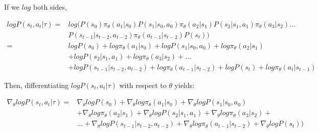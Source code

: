 \documentclass[letterpaper,11pt]{article}
\begin{document}
\vspace{0.2cm}
\noindent If we $log$ both sides, \\
\vspace{-0.2cm}

$$
\begin{aligned}
    log P(s_{t}, a_{t} | \tau)  ={}& log (P(s_{0}) \pi_{\theta}(a_{1} | s_{0}) P(s_{1} | s_{0}, a_{0}) \pi_{\theta}(a_{2} | s_{1}) P(s_{2} | s_{1}, a_{1}) \pi_{\theta}(a_{3} | s_{2}) ... \\
& P(s_{t-1} | s_{t-2}, a_{t-2}) \pi_{\theta}(a_{t-1} | s_{t-2}) P(s_{t})) \\ ={}& log P(s_{0}) + log \pi_{\theta}(a_{1} | s_{0}) + log P(s_{1} | s_{0}, a_{0}) + log \pi_{\theta}(a_{2} | s_{1})\\
& + log P(s_{2} | s_{1}, a_{1}) + log \pi_{\theta}(a_{3} | s_{2}) + ... \\
& + log P(s_{t-1} | s_{t-2}, a_{t-2}) + log \pi_{\theta}(a_{t-1} | s_{t-2}) + log P(s_{t}) + log \pi_{\theta}(a_{t} | s_{t-1})
\end{aligned}
$$

\vspace{0.2cm}
\noindent Then,  differentiating $log P(s_{t}, a_{t} | \tau)$ with respect to $\theta$ yields: \\
\vspace{-0.15cm}

$$
\begin{aligned}
    \nabla_{\theta} log P(s_{t}, a_{t} | \tau)  ={}& \nabla_{\theta} log P(s_{0}) + \nabla_{\theta} log \pi_{\theta}(a_{1} | s_{0}) + \nabla_{\theta} log P(s_{1} | s_{0}, a_{0}) \\
& + \nabla_{\theta} log \pi_{\theta}(a_{2} | s_{1}) + \nabla_{\theta} log P(s_{2} | s_{1}, a_{1}) + \nabla_{\theta} log \pi_{\theta}(a_{3} | s_{2}) + \\
& ... + \nabla_{\theta} log P(s_{t-1} | s_{t-2}, a_{t-2}) + \nabla_{\theta} log \pi_{\theta}(a_{t-1} | s_{t-2}) + \nabla_{\theta} log P(s_{t})) \\
\end{aligned}
$$

\vspace{0.2cm}
\end{document}
